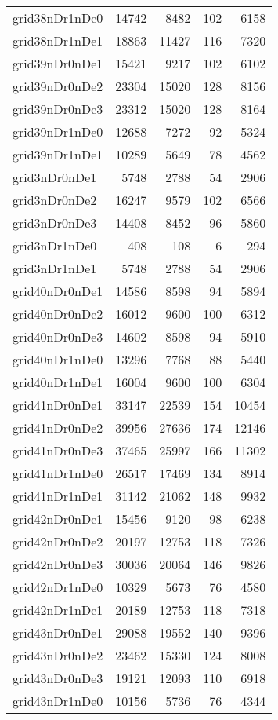 \begin{longtable}{lrrrr}
grid38nDr1nDe0 & 14742 & 8482 & 102 & 6158 \\
grid38nDr1nDe1 & 18863 & 11427 & 116 & 7320 \\
grid39nDr0nDe1 & 15421 & 9217 & 102 & 6102 \\
grid39nDr0nDe2 & 23304 & 15020 & 128 & 8156 \\
grid39nDr0nDe3 & 23312 & 15020 & 128 & 8164 \\
grid39nDr1nDe0 & 12688 & 7272 & 92 & 5324 \\
grid39nDr1nDe1 & 10289 & 5649 & 78 & 4562 \\
grid3nDr0nDe1 & 5748 & 2788 & 54 & 2906 \\
grid3nDr0nDe2 & 16247 & 9579 & 102 & 6566 \\
grid3nDr0nDe3 & 14408 & 8452 & 96 & 5860 \\
grid3nDr1nDe0 & 408 & 108 & 6 & 294 \\
grid3nDr1nDe1 & 5748 & 2788 & 54 & 2906 \\
grid40nDr0nDe1 & 14586 & 8598 & 94 & 5894 \\
grid40nDr0nDe2 & 16012 & 9600 & 100 & 6312 \\
grid40nDr0nDe3 & 14602 & 8598 & 94 & 5910 \\
grid40nDr1nDe0 & 13296 & 7768 & 88 & 5440 \\
grid40nDr1nDe1 & 16004 & 9600 & 100 & 6304 \\
grid41nDr0nDe1 & 33147 & 22539 & 154 & 10454 \\
grid41nDr0nDe2 & 39956 & 27636 & 174 & 12146 \\
grid41nDr0nDe3 & 37465 & 25997 & 166 & 11302 \\
grid41nDr1nDe0 & 26517 & 17469 & 134 & 8914 \\
grid41nDr1nDe1 & 31142 & 21062 & 148 & 9932 \\
grid42nDr0nDe1 & 15456 & 9120 & 98 & 6238 \\
grid42nDr0nDe2 & 20197 & 12753 & 118 & 7326 \\
grid42nDr0nDe3 & 30036 & 20064 & 146 & 9826 \\
grid42nDr1nDe0 & 10329 & 5673 & 76 & 4580 \\
grid42nDr1nDe1 & 20189 & 12753 & 118 & 7318 \\
grid43nDr0nDe1 & 29088 & 19552 & 140 & 9396 \\
grid43nDr0nDe2 & 23462 & 15330 & 124 & 8008 \\
grid43nDr0nDe3 & 19121 & 12093 & 110 & 6918 \\
grid43nDr1nDe0 & 10156 & 5736 & 76 & 4344 \\

\end{longtable}
